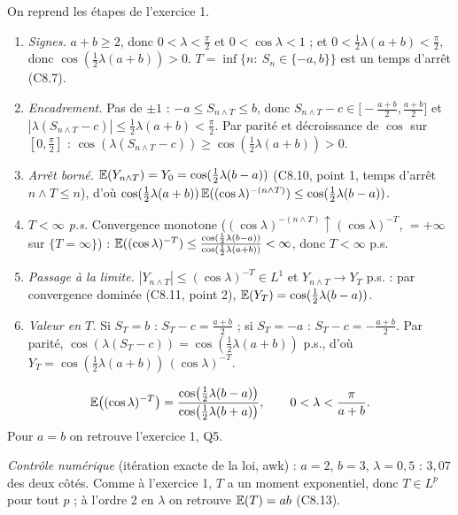 \documentclass[11pt,a4paper]{article}
\begin{document}
\begin{exo}
On reprend les étapes de l'exercice 1.
\begin{enumerate}
  \item \emph{Signes.} $a+b\ge2$, donc $0<\lambda<\frac\pi2$ et $0<\cos\lambda<1$ ; et $0<\frac12\lambda(a+b)<\frac\pi2$, donc
  $\cos(\frac12\lambda(a+b))>0$. $T=\inf\{n:\ S_n\in\{-a,b\}\}$ est un temps d'arrêt (C8.7).
  \item \emph{Encadrement.} Pas de $\pm1$ : $-a\le S_{n\wedge T}\le b$, donc $S_{n\wedge T}-c\in\bigl[-\frac{a+b}2,\frac{a+b}2\bigr]$
  et $|\lambda(S_{n\wedge T}-c)|\le\frac12\lambda(a+b)<\frac\pi2$. Par parité et décroissance de $\cos$ sur $[0,\frac\pi2]$ :
  $\cos(\lambda(S_{n\wedge T}-c))\ge\cos(\frac12\lambda(a+b))>0$.
  \item \emph{Arrêt borné.} $\mathbb{E}(Y_{n\wedge T})=Y_0=\cos(\frac12\lambda(b-a))$ (C8.10, point 1, temps d'arrêt $n\wedge T\le n$), d'où
  $\cos(\frac12\lambda(a+b))\,\mathbb{E}((\cos\lambda)^{-(n\wedge T)})\le\cos(\frac12\lambda(b-a))$.
  \item \emph{$T<\infty$ p.s.} Convergence monotone ($(\cos\lambda)^{-(n\wedge T)}\uparrow(\cos\lambda)^{-T}$, $=+\infty$ sur $\{T=\infty\}$) :
  $\mathbb{E}((\cos\lambda)^{-T})\le\frac{\cos(\frac12\lambda(b-a))}{\cos(\frac12\lambda(a+b))}<\infty$, donc $T<\infty$ p.s.
  \item \emph{Passage à la limite.} $|Y_{n\wedge T}|\le(\cos\lambda)^{-T}\in L^1$ et $Y_{n\wedge T}\to Y_T$ p.s. : par convergence dominée
  (C8.11, point 2), $\mathbb{E}(Y_T)=\cos(\frac12\lambda(b-a))$.
  \item \emph{Valeur en $T$.} Si $S_T=b$ : $S_T-c=\frac{a+b}2$ ; si $S_T=-a$ : $S_T-c=-\frac{a+b}2$. Par parité,
  $\cos(\lambda(S_T-c))=\cos(\frac12\lambda(a+b))$ p.s., d'où $Y_T=\cos(\frac12\lambda(a+b))\,(\cos\lambda)^{-T}$.
\end{enumerate}
\begin{resultat}
\[\mathbb{E}\bigl((\cos\lambda)^{-T}\bigr)=\frac{\cos\bigl(\frac12\lambda(b-a)\bigr)}{\cos\bigl(\frac12\lambda(b+a)\bigr)},\qquad0<\lambda<\frac\pi{a+b}.\]
Pour $a=b$ on retrouve l'exercice 1, Q5.
\end{resultat}
\emph{Contrôle numérique} (itération exacte de la loi, awk) : $a=2$, $b=3$, $\lambda=0{,}5$ : $3{,}07$ des deux côtés.
Comme à l'exercice 1, $T$ a un moment exponentiel, donc $T\in L^p$ pour tout $p$ ; à l'ordre 2 en $\lambda$ on retrouve $\mathbb{E}(T)=ab$ (C8.13).
\end{exo}
\end{document}
